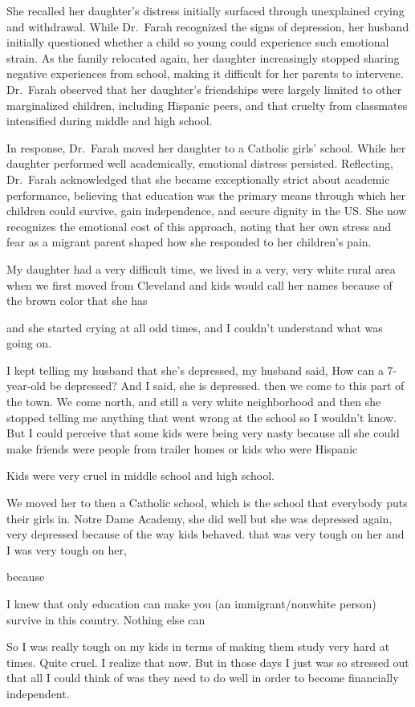 She recalled her daughter’s distress initially surfaced through unexplained crying and withdrawal. While Dr.~Farah recognized the signs of depression, her husband initially questioned whether a child so young could experience such emotional strain. As the family relocated again, her daughter increasingly stopped sharing negative experiences from school, making it difficult for her parents to intervene. Dr.~Farah observed that her daughter’s friendships were largely limited to other marginalized children, including Hispanic peers, and that cruelty from classmates intensified during middle and high school.

In response, Dr.~Farah moved her daughter to a Catholic girls’ school. While her daughter performed well academically, emotional distress persisted. Reflecting, Dr.~Farah acknowledged that she became exceptionally strict about academic performance, believing that education was the primary means through which her children could survive, gain independence, and secure dignity in the US. She now recognizes the emotional cost of this approach, noting that her own stress and fear as a migrant parent shaped how she responded to her children’s pain.

\begin{FoundPoem}
My daughter had a very difficult time,	 we lived in a very, very white rural
area when we first moved from Cleveland        			 and kids
would call her names because of the brown color that she has

and she started crying at all odd times, and I couldn't understand what was
going on.

I kept telling my husband that she's depressed,     my  husband said, How can
a 7-year-old be depressed? And I said, she is depressed.
then we come to this part of the town. We come north, and still a very
white neighborhood             and then she stopped telling  me anything that
went wrong at the school so I wouldn't know. But I could perceive that some
kids were being very nasty because all she could make friends were people
from trailer homes or kids who were Hispanic

Kids were very cruel in middle school and high school. 

We moved her to then a Catholic school, which is the school that everybody
puts their girls in.        Notre Dame Academy, 		 she did well but she
was depressed again, very depressed because of the way kids behaved.   that	
        was very tough on her and I was very tough on her,
        
because
 
I knew that only education can make you (an immigrant/nonwhite person)
survive in this country. Nothing else can

So I was really tough on my kids in terms of making them study very hard at
times. Quite cruel. I realize that now. But in those days I just was so stressed
out that all I could think of was they need to do well in order to become
financially independent.
\end{FoundPoem}

